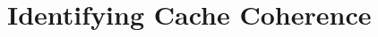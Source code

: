 \chapter{Identifying Cache Coherence}
\label{chap:identifying_cache_coherence}
\label{cha:identifying_cache_coherence}

\stopallthesefloats

\stopallthesefloats

\stopallthesefloats

\stopallthesefloats

\stopallthesefloats

\stopallthesefloats

\stopallthesefloats

\stopallthesefloats

